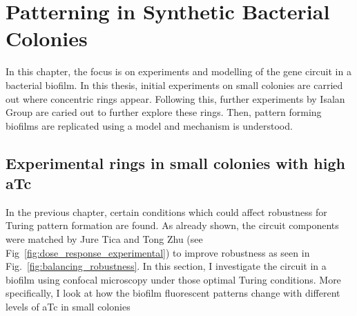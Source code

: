 \chapter{Patterning in Synthetic Bacterial Colonies} \label{chapter3}
%


In this chapter, the focus is on experiments and modelling of the gene circuit in a bacterial biofilm.
In this thesis, initial experiments on small colonies are carried out where concentric rings appear. Following this, further experiments by Isalan Group are caried out to further explore these rings.
Then, pattern forming biofilms are replicated using a model and mechanism is understood.
%

\section{Experimental rings in small colonies with high aTc}\label{Rings in small colonies with high aTc}
In the previous chapter, certain conditions which could affect robustness for Turing pattern formation are found.
As already shown, the circuit components were matched by Jure Tica and Tong Zhu (see Fig~\ref{fig:dose_response_experimental}) to improve robustness as seen in Fig.~\ref{fig:balancing_robustness}.
In this section, I investigate the circuit in a biofilm using confocal microscopy under those optimal Turing conditions.
More specifically, I look at how the biofilm fluorescent patterns change with different levels of aTc in small colonies

